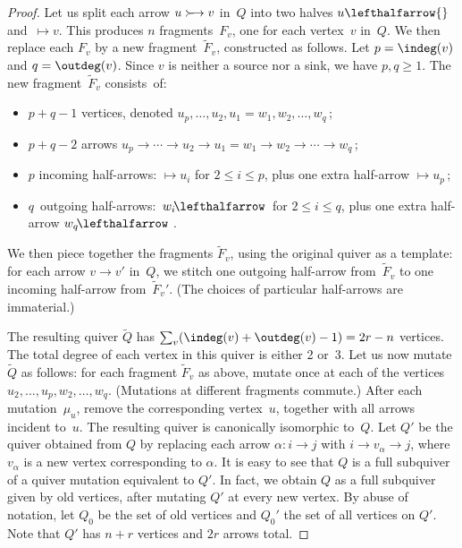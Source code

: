 \begin{proof}
Let us split each arrow $u \mathrel{\succ\hspace{-2pt}\rightarrow} v$ in~$Q$ into two halves 
$u\lefthalfarrow{}$ and~${}\mapsto v$. This produces $n$ fragments~$F_v$, one for each vertex~$v$ in~$Q$. We then replace each $F_v$ by a new fragment~$\widetilde F_v$, constructed as follows. Let $p=\indeg (v)$ and $q=\outdeg(v)$. Since $v$ is neither a source nor a sink, we have $p,q\ge 1$. 
The new fragment~$\widetilde F_v$ consists~of: 
\begin{itemize} %
\item
$p+q-1$ vertices, denoted 
$u_{p},\dots,u_2,u_1=w_1,w_2,\dots,w_{q}\,$;
\item
$p+q-2$ arrows $u_{p}\longrightarrow \cdots \longrightarrow u_2\longrightarrow u_1=w_1\longrightarrow w_2 \longrightarrow\cdots\longrightarrow w_{q}\,$;
\item 
$p$ incoming half-arrows: $\mapsto \!u_i$ for $2\le i\le p$, plus one extra half-arrow $\mapsto \!u_{p}\,$;
\item
$q$~outgoing half-arrows: $\,w_i\!\lefthalfarrow\,$ for $2\le i\le q$, plus one extra half-arrow $w_q\!\lefthalfarrow\,\,$. 
\end{itemize}
We then piece together the fragments $\widetilde F_v$, using the original quiver as a template: for each arrow $v\longrightarrow v'$ in~$Q$, we stitch one outgoing half-arrow from~$\widetilde F_v$ to one incoming half-arrow from~$\widetilde F_v'$. (The choices of particular half-arrows are immaterial.) 

The resulting quiver $\widetilde Q$ has 
$\sum_v (\indeg(v)+\outdeg(v)-1)=2r-n$ vertices. 
The total degree of each vertex in this quiver is either 2 or~3. 
Let us now mutate $\widetilde Q$ as follows: for each fragment $\widetilde F_v$ as above, mutate once at each of the vertices $u_2,\dots,u_{p},w_2,\dots,w_q$. (Mutations at different fragments commute.) 
After each mutation~$\mu_u$, remove the corresponding vertex~$u$, together with all arrows incident to~$u$. The resulting quiver is canonically isomorphic to~$Q$. 
%
\iffalse
Let $Q'$ be the quiver obtained from $Q$ by replacing each arrow $\alpha:i\longrightarrow j$ with $i\longrightarrow v_\alpha \longrightarrow j$, where $v_\alpha$ is a new vertex corresponding to $\alpha$. It is easy to see that $Q$ is a full subquiver of a quiver mutation equivalent to $Q'$. In fact, we obtain $Q$ as a full subquiver given by old vertices, after mutating $Q'$ at every new vertex. By abuse of notation, let $Q_0$ be the set of old vertices and $Q_0'$ the set of all vertices on $Q'$. Note that $Q'$ has $n+r$ vertices and $2r$ arrows total.


\end{proof}
